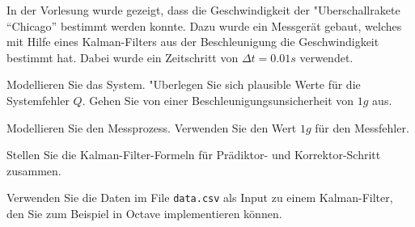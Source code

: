 In der Vorlesung wurde gezeigt, dass die Geschwindigkeit der "Uberschallrakete
``Chicago'' bestimmt werden konnte. Dazu wurde ein Messgerät gebaut,
welches mit Hilfe eines Kalman-Filters aus der Beschleunigung die
Geschwindigkeit bestimmt hat. Dabei wurde ein Zeitschritt von $\Delta t=0.01s$
verwendet.
\begin{teilaufgaben}
\item Modellieren Sie das System.
"Uberlegen Sie sich plausible Werte für die Systemfehler $Q$.
Gehen Sie von einer Beschleunigungsunsicherheit von $1g$
aus.
\item Modellieren Sie den Messprozess. Verwenden Sie den Wert $1g$ für
den Messfehler.
\item Stellen Sie die Kalman-Filter-Formeln für Prädiktor- und
Korrektor-Schritt zusammen.
\item Verwenden Sie die Daten im File {\tt data.csv} als Input zu einem
Kalman-Filter, den Sie zum Beispiel in Octave implementieren können.
\end{teilaufgaben}


